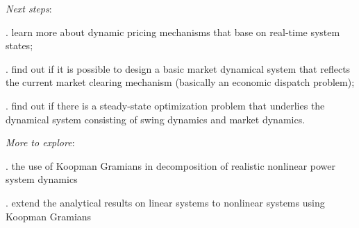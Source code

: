 \documentclass[journal,12pt,onecolumn,draftclsnofoot]{IEEEtran}
\begin{document}
\noindent
\emph{Next steps}: 

. learn more about dynamic pricing mechanisms that base on real-time system states;

. find out if it is possible to design a basic market dynamical system that reflects the current market clearing mechanism (basically an economic dispatch problem);

. find out if there is a steady-state optimization problem that underlies the dynamical system consisting of swing dynamics and market dynamics. 

\noindent
\emph{More to explore}:

. the use of Koopman Gramians in decomposition of realistic nonlinear power system dynamics

. extend the analytical results on linear systems to nonlinear systems using Koopman Gramians














  
  
\end{document}
